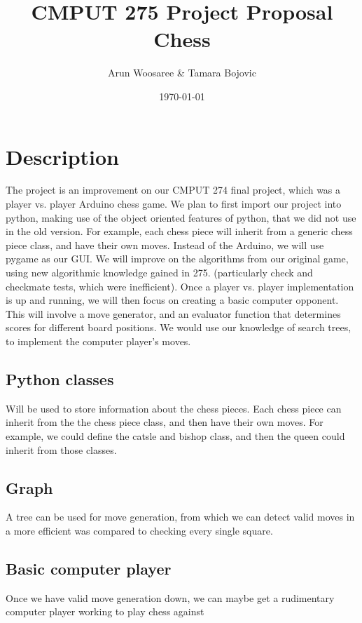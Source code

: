 \documentclass{article}
\title{CMPUT 275 Project Proposal\\
\vspace{.25cm}\large Chess \vspace{-.5cm}}
\author{\LARGE Arun Woosaree  \& Tamara Bojovic}
\date{\today}
\begin{document}
  \maketitle %

  \section{Description}
    The project is an improvement on our CMPUT 274 final project, which was a
    player vs. player Arduino chess game. We plan to first import our project
    into python, making use of the object oriented features of python, that we
    did not use in the old version. For example, each chess piece will inherit
    from a generic chess piece class, and have their own moves. Instead of the
    Arduino, we will use pygame as our GUI. We will improve on the algorithms
    from our original game, using new algorithmic knowledge gained in 275.
    (particularly check and checkmate tests, which were inefficient). Once a
    player vs. player implementation is up and running, we will then focus on
    creating a basic computer opponent. This will involve a move generator, and
    an evaluator function that determines scores for different board positions.
    We would use our knowledge of search trees, to implement the computer
    player’s moves.

    \subsection{Python classes}
    Will be used to store information about the chess pieces.
    Each chess piece can inherit from the the chess piece class, and then have
    their own moves. For example, we could define the catsle and bishop class, and then
    the queen could inherit from those classes.

    \subsection{Graph}
    A tree can be used for move generation, from which we can detect valid moves
    in a more efficient was compared to checking every single square.

    \subsection{Basic computer player}
    Once we have valid move generation down, we can maybe get a rudimentary
    computer player working to play chess against
\end{document}
